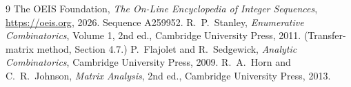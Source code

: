 \documentclass[11pt,a4paper]{article}
\theoremstyle{plain}
\theoremstyle{definition}
\begin{document}
\begin{thebibliography}{9}
 The OEIS Foundation, \emph{The On-Line Encyclopedia of Integer
Sequences}, \url{https://oeis.org}, 2026. Sequence A259952.
 R.~P.~Stanley, \emph{Enumerative Combinatorics}, Volume 1, 2nd ed.,
Cambridge University Press, 2011. (Transfer-matrix method, Section 4.7.)
 P.~Flajolet and R.~Sedgewick, \emph{Analytic Combinatorics}, Cambridge
University Press, 2009.
 R.~A.~Horn and C.~R.~Johnson, \emph{Matrix Analysis}, 2nd ed., Cambridge
University Press, 2013.
\end{thebibliography}
\end{document}
